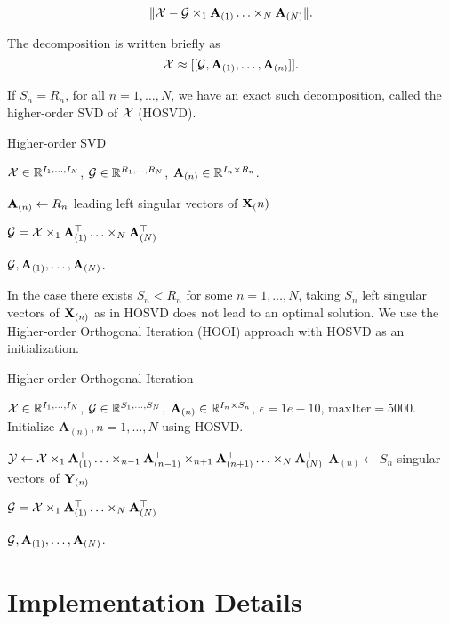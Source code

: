 \begin{equation}
    \|\mathcal{X} - \mathcal{G}\times_1\mathbf{A}_{(1)}\ldots \times_N \mathbf{A}_{(N)}\|.
\end{equation}

The decomposition is written briefly as
\begin{equation}
    \mathcal{X} \approx [[\mathcal{G}, \mathbf{A}_{(1)},\ldots, \mathbf{A}_{(n)}]].
\end{equation}

If $S_n = R_n$, for all $n = 1,\ldots,N$, we have an exact such decomposition, called the higher-order SVD of $\mathcal{X}$ (HOSVD).


\begin{algorithm}
    \caption{Higher-order SVD}
    \begin{algorithmic}
        \Require $\mathcal{X}\in{\mathbb{R}}^{I_1,\ldots, I_N}$, $\mathcal{G}\in{\mathbb{R}}^{R_1,\ldots,R_N}$, $\mathbf{A}_{(n)}\in{\mathbb{R}}^{I_n\times R_n}$.

        \State $\mathbf{A}_{(n)} \gets R_n$ leading left singular vectors of $\mathbf{X}_({n})$
        \EndFor

        $\mathcal{G} = \mathcal{X}\times_1\mathbf{A}_{(1)}^\top\ldots \times_N \mathbf{A}_{(N)}^\top$

        \Ensure $\mathcal{G}, \mathbf{A}_{(1)},\ldots,\mathbf{A}_{(N)}$.
    \end{algorithmic}
\end{algorithm}

In the case there exists $S_n < R_n$ for some $n = 1,\ldots, N$, taking $S_n$ left singular vectors of $\mathbf{X}_{(n)}$ as in HOSVD does not lead to an optimal solution. We use the Higher-order Orthogonal Iteration (HOOI) approach with HOSVD as an initialization.

\begin{algorithm}
    \caption{Higher-order Orthogonal Iteration}
    \begin{algorithmic}
        \Require $\mathcal{X}\in{\mathbb{R}}^{I_1,\ldots, I_N}$, $\mathcal{G}\in{\mathbb{R}}^{S_1,\ldots,S_N}$, $\mathbf{A}_{(n)}\in{\mathbb{R}}^{I_n\times S_n}$, $\epsilon = 1e-10$, $\text{maxIter} = 5000$.
        \State Initialize $\mathbf{A}_{(n)}, n=1,\ldots, N$ using HOSVD.

        \State $\mathcal{Y} \gets \mathcal{X} \times_1 \mathbf{A}_{(1)}^\top \ldots \times_{n-1} \mathbf{A}_{(n-1)}^\top  \times_{n+1} \mathbf{A}_{(n+1)}^\top \ldots \times_N \mathbf{A}_{(N)}^\top$
        \State $\mathbf{A}_{(n)} \gets S_n$ singular vectors of $\mathbf{Y}_{(n)}$
        \EndFor
        \EndWhile

        $\mathcal{G} = \mathcal{X}\times_1\mathbf{A}_{(1)}^\top\ldots \times_N \mathbf{A}_{(N)}^\top$

        \Ensure $\mathcal{G}, \mathbf{A}_{(1)},\ldots,\mathbf{A}_{(N)}$.
    \end{algorithmic}
\end{algorithm}


\section{Implementation Details}
